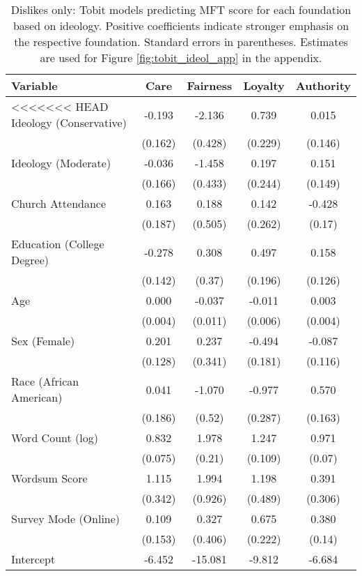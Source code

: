 \begin{table}[ht]
\centering
\caption{Dislikes only: Tobit models predicting MFT score for each foundation based 
           on ideology. Positive coefficients indicate stronger emphasis on the respective 
           foundation. Standard errors in parentheses. Estimates are used for 
           Figure \ref{fig:tobit_ideol_app} in the appendix.} 
\label{tab:tobit_dislike}
\begingroup\footnotesize
\begin{tabular}{lcccc}
  \hline
Variable & Care & Fairness & Loyalty & Authority \\ 
  \hline
<<<<<<< HEAD
Ideology (Conservative) & -0.193 &  -2.136 &  0.739 &  0.015 \\ 
   & (0.162) & (0.428) & (0.229) & (0.146) \\ 
  Ideology (Moderate) & -0.036 &  -1.458 &  0.197 &  0.151 \\ 
   & (0.166) & (0.433) & (0.244) & (0.149) \\ 
  Church Attendance &  0.163 &   0.188 &  0.142 & -0.428 \\ 
   & (0.187) & (0.505) & (0.262) & (0.17) \\ 
  Education (College Degree) & -0.278 &   0.308 &  0.497 &  0.158 \\ 
   & (0.142) & (0.37) & (0.196) & (0.126) \\ 
  Age &  0.000 &  -0.037 & -0.011 &  0.003 \\ 
   & (0.004) & (0.011) & (0.006) & (0.004) \\ 
  Sex (Female) &  0.201 &   0.237 & -0.494 & -0.087 \\ 
   & (0.128) & (0.341) & (0.181) & (0.116) \\ 
  Race (African American) &  0.041 &  -1.070 & -0.977 &  0.570 \\ 
   & (0.186) & (0.52) & (0.287) & (0.163) \\ 
  Word Count (log) &  0.832 &   1.978 &  1.247 &  0.971 \\ 
   & (0.075) & (0.21) & (0.109) & (0.07) \\ 
  Wordsum Score &  1.115 &   1.994 &  1.198 &  0.391 \\ 
   & (0.342) & (0.926) & (0.489) & (0.306) \\ 
  Survey Mode (Online) &  0.109 &   0.327 &  0.675 &  0.380 \\ 
   & (0.153) & (0.406) & (0.222) & (0.14) \\ 
  Intercept & -6.452 & -15.081 & -9.812 & -6.684 \\ 

\end{tabular}
\end{table}
